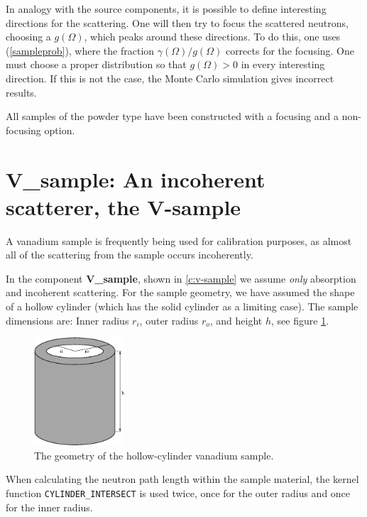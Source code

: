 In analogy with the source components, it is possible to define
interesting directions for the scattering.  
One will then try to focus the scattered neutrons,
choosing a $g(\Omega)$, which peaks around these directions. 
To do this, one uses (\ref{sampleprob}), where the
fraction $\gamma(\Omega)/g(\Omega)$ corrects for the focusing.
One must choose a proper distribution so that
$g(\Omega) > 0$ in every interesting direction. If this is not the 
case, the Monte Carlo simulation gives incorrect results.

All samples of the powder type have been constructed with a focusing
and a non-focusing option.

\section{V\_sample: An incoherent scatterer, the V-sample}
\label{s:v_sample}

A  vanadium sample is frequently being used for 
calibration purposes, as
almost all of the scattering from the sample occurs incoherently.

In the component {\bf V\_sample}, shown in \ref{c:v-sample}
we assume {\em only} absorption and incoherent scattering.
For the sample geometry, we have assumed the shape of a 
hollow cylinder (which has the solid cylinder as a limiting case).
The sample dimensions are: Inner radius $r_i$, 
outer radius $r_o$, and height $h$, see figure \ref{f:v-sample}.
\begin{figure}
  \begin{center}
    \includegraphics[width=0.3\textwidth]{figures/vsample.eps}
  \end{center}
\caption{The geometry of the hollow-cylinder vanadium sample.}
\label{f:v-sample}
\end{figure}

When calculating the neutron path length within
the sample material, the kernel function 
\verb+CYLINDER_INTERSECT+
is used twice, once for the outer radius and once 
for the inner radius.

